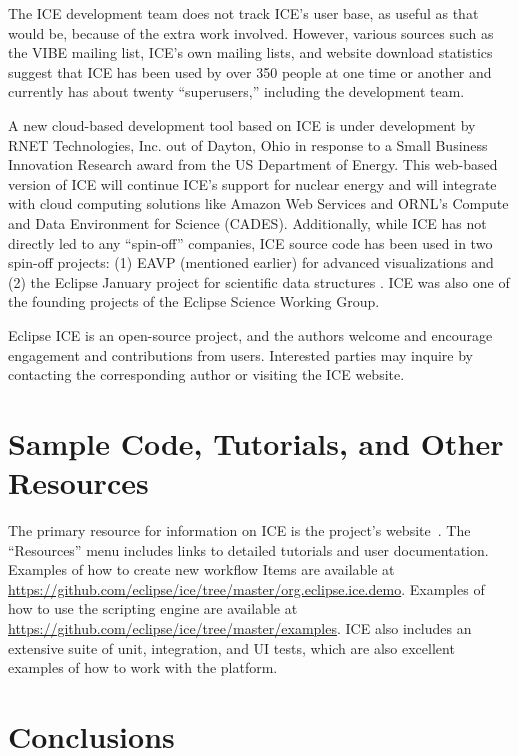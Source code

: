 The ICE development team does not track ICE's user base, as useful as
that would be, because of the extra work involved. However, various
sources such as the VIBE mailing list, ICE's own mailing lists, and
website download statistics suggest that ICE has been used by over 350
people at one time or another and currently has about twenty
``superusers,'' including the development team.

A new cloud-based development tool based on ICE is under development by
RNET Technologies, Inc. out of Dayton, Ohio in response to a Small Business Innovation 
Research award from the US Department of Energy. This web-based version of 
ICE will continue ICE's support for nuclear energy and will integrate with cloud 
computing solutions like Amazon Web Services and ORNL's Compute and Data
Environment for Science (CADES). Additionally, while ICE has not directly led to
any ``spin-off'' companies, ICE source code has been used
in two spin-off projects: (1) EAVP (mentioned earlier) for advanced
visualizations and (2) the Eclipse January project for scientific data
structures \cite{graham_eclipse_2016}. ICE was also one of the founding
projects of the Eclipse Science Working Group.

Eclipse ICE is an open-source project, and the authors welcome and encourage
engagement and contributions from users. Interested parties may inquire by
contacting the corresponding author or visiting the ICE website.

\section{Sample Code, Tutorials, and Other
Resources}\label{sample-code-tutorials-and-other-resources}

The primary resource for information on ICE is the project's 
website~\cite{billings_eclipse_2016}. The ``Resources'' menu includes links to
detailed tutorials and user documentation. Examples of how to create
new workflow Items are available at
\url{https://github.com/eclipse/ice/tree/master/org.eclipse.ice.demo}.
Examples of how to use the scripting engine are available at
\url{https://github.com/eclipse/ice/tree/master/examples}. ICE also includes an
extensive suite of unit, integration, and UI tests, which are
also excellent examples of how to work with the platform.

\section{Conclusions}\label{conclusions}

